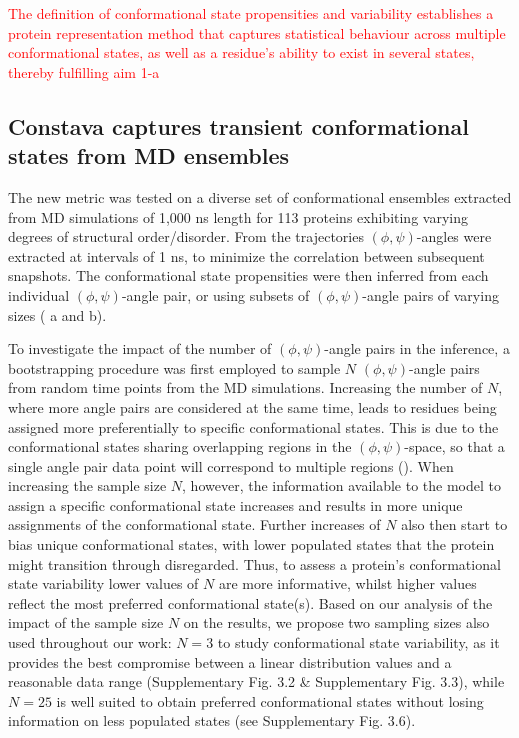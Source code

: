 \textcolor{red}{The definition of conformational state propensities and variability establishes a protein representation method that captures statistical behaviour across multiple conformational states, as well as a residue's ability to exist in several states, thereby fulfilling aim 1-a}

\subsection{Constava captures transient conformational states from MD ensembles} 
\label{section:multi_sample}

The new metric was tested on a diverse set of conformational ensembles extracted from  MD simulations of 1,000 ns length for 113 proteins exhibiting varying degrees of structural order/disorder. From the trajectories $(\phi, \psi)$-angles were extracted at intervals of 1 ns, to minimize the correlation between subsequent snapshots. The conformational state propensities were then inferred from each individual $(\phi, \psi)$-angle pair, or using subsets of $(\phi, \psi)$-angle pairs of varying sizes ( a and b).

To investigate the impact of the number of $(\phi, \psi)$-angle pairs in the inference, a bootstrapping procedure was first employed to sample $N$ $(\phi, \psi)$-angle pairs from random time points from the MD simulations. Increasing the number of $N$, where more angle pairs are considered at the same time, leads to residues being assigned more preferentially to specific conformational states. This is due to the conformational states sharing overlapping regions in the $(\phi, \psi)$-space, so that a single angle pair data point will correspond to multiple regions (). When increasing the sample size $N$, however, the information available to the model to assign a specific conformational state increases and results in more unique assignments of the conformational state. Further increases of $N$ also then start to bias unique conformational states, with lower populated states that the protein might transition through disregarded. Thus, to assess a protein's conformational state variability lower values of $N$ are more informative, whilst higher values reflect the most preferred conformational state(s). Based on our analysis of the impact of the sample size $N$ on the results, we propose two sampling sizes also used throughout our work: $N = 3$ to study conformational state variability, as it provides the best compromise between a linear distribution values and a reasonable data range (Supplementary Fig. 3.2 \& Supplementary Fig. 3.3),
while $N = 25$ is well suited to obtain preferred conformational states without losing information on less populated states (see Supplementary Fig. 3.6).

